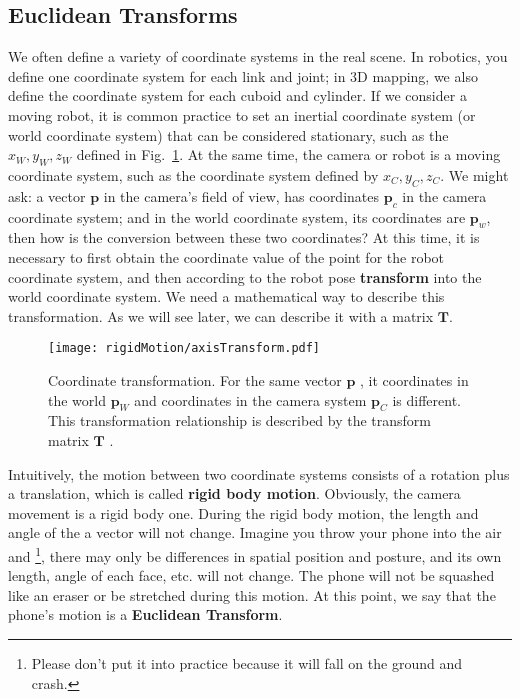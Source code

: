 \subsection{Euclidean Transforms}
We often define a variety of coordinate systems in the real scene. In robotics, you define one coordinate system for each link and joint; in 3D mapping, we also define the coordinate system for each cuboid and cylinder. If we consider a moving robot, it is common practice to set an inertial coordinate system (or world coordinate system) that can be considered stationary, such as the $x_W, y_W, z_W$ defined in Fig.~\ref{fig:axisTransform}. At the same time, the camera or robot is a moving coordinate system, such as the coordinate system defined by $x_C, y_C, z_C$. We might ask: a vector $\mathbf{p}$ in the camera's field of view, has coordinates $\mathbf{p}_c$ in the camera coordinate system; and in the world coordinate system, its coordinates are $ \mathbf{p}_w$, then how is the conversion between these two coordinates? At this time, it is necessary to first obtain the coordinate value of the point for the robot coordinate system, and then according to the robot pose \textbf{transform} into the world coordinate system. We need a mathematical way to describe this transformation. As we will see later, we can describe it with a matrix $\mathbf{T}$.

\begin{figure}[!htp]
    \centering
    \texttt{[image: rigidMotion/axisTransform.pdf]}
    \caption {Coordinate transformation. For the same vector $ \mathbf{p}$ , it coordinates in the world $\mathbf{p}_W$ and coordinates in the camera system $ \mathbf{p}_C$ is different. This transformation relationship is described by the transform matrix $ \mathbf{T} $ . }
    \label{fig:axisTransform}
\end{figure}

Intuitively, the motion between two coordinate systems consists of a rotation plus a translation, which is called \textbf {rigid body motion}. Obviously, the camera movement is a rigid body one. During the rigid body motion, the length and angle of the a vector will not change. Imagine you throw your phone into the air and \footnote {Please don't put it into practice because it will fall on the ground and crash.}, there may only be differences in spatial position and posture, and its own length, angle of each face, etc. will not change. The phone will not be squashed like an eraser or be stretched during this motion. At this point, we say that the phone's motion is a \textbf {Euclidean Transform}.


